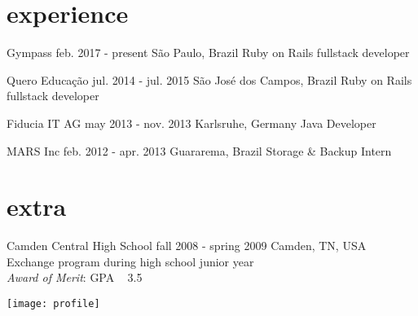 \documentclass[]{friggeri-cv}
\begin{document}
\section{experience}

\begin{entrylist}
  \entry
  {Gympass}
  {feb. 2017 - present}
  {São Paulo, Brazil}
  {Ruby on Rails fullstack developer}
  
  \entry
    {Quero Educação}
    {jul. 2014 - jul. 2015}
    {São José dos Campos, Brazil}
    {Ruby on Rails fullstack developer}

  \entry
  	{Fiducia IT AG}
    {may 2013 - nov. 2013}
    {Karlsruhe, Germany}
    {Java Developer}

  \entry
    {MARS Inc}
    {feb. 2012 - apr. 2013}
    {Guararema, Brazil}
    {Storage \& Backup Intern}

\end{entrylist}

\section{extra}

\begin{entrylist}
  \entry
    {Camden Central High School}
    {fall 2008 - spring 2009}
    {Camden, TN, USA}
    {Exchange program during high school junior year\\
    \textit{Award of Merit}: GPA \geq ~ 3.5}\\


\end{entrylist}

\begin{rside}
 \texttt{[image: profile]}
\end{rside}
\end{document}
